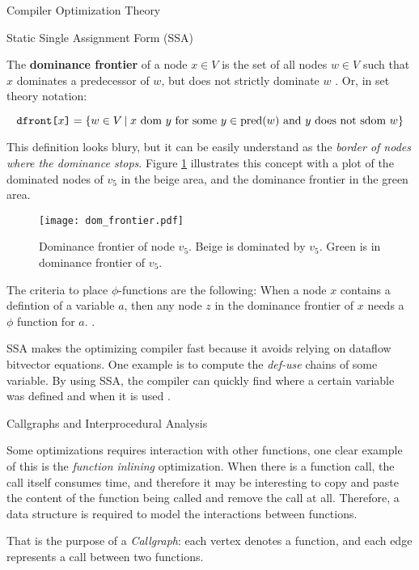 \begin{section}{Compiler Optimization Theory}
\begin{subsection}{Static Single Assignment Form (SSA)}
\begin{definition}
	The \textbf{dominance frontier} of a node $x \in V$ is the set of all nodes $w \in V$
	such that $x$ dominates a predecessor of $w$, but does not strictly dominate $w$ \citep{appel2004modern}.
	Or, in set theory notation:
\end{definition}
\vspace*{-1cm}
	$$\texttt{dfront[}x\texttt{]} = \{w \in V\,|\;x \text{ dom } y \text{ for some } y \in \text{pred}(w) \text{ and } y \text{ does not sdom } w\}$$

This definition looks blury, but it can be easily understand as the
\textit{border of nodes where the dominance stops}.  Figure \ref{fig:dom_frontier} illustrates this
concept with a plot of the dominated nodes of $v_5$ in the beige area, and the dominance frontier
in the green area.

\begin{figure}[ht]
 \centering
 \texttt{[image: dom\_frontier.pdf]}
 \caption{Dominance frontier of node $v_5$. Beige is dominated by $v_5$. Green is in dominance frontier of $v_5$.}
 \label{fig:dom_frontier}
\end{figure}

The criteria to place $\phi$-functions are the following: When a node $x$ contains a defintion
of a variable $a$, then any node $z$ in the dominance frontier of $x$ needs a $\phi$ function
for $a$. \citep{appel2004modern}.

SSA makes the optimizing compiler fast because it avoids relying on dataflow
bitvector equations. One example is to compute the \textit{def-use} chains
of some variable. By using SSA, the compiler can quickly find where a certain
variable was defined and when it is used \citep{appel2004modern}.

\end{subsection}

\begin{subsection}{Callgraphs and Interprocedural Analysis}

Some optimizations requires interaction with other functions, one clear example
of this is the \textit{function inlining} optimization. When there is a
function call, the call itself consumes time, and therefore it may be
interesting to copy and paste the content of the function being called and
remove the call at all.  Therefore, a data structure is required to model the
interactions between functions.

That is the purpose of a \textit{Callgraph}: each vertex denotes a function,
and each edge represents a call between two functions. 


\end{subsection}
\end{section}
